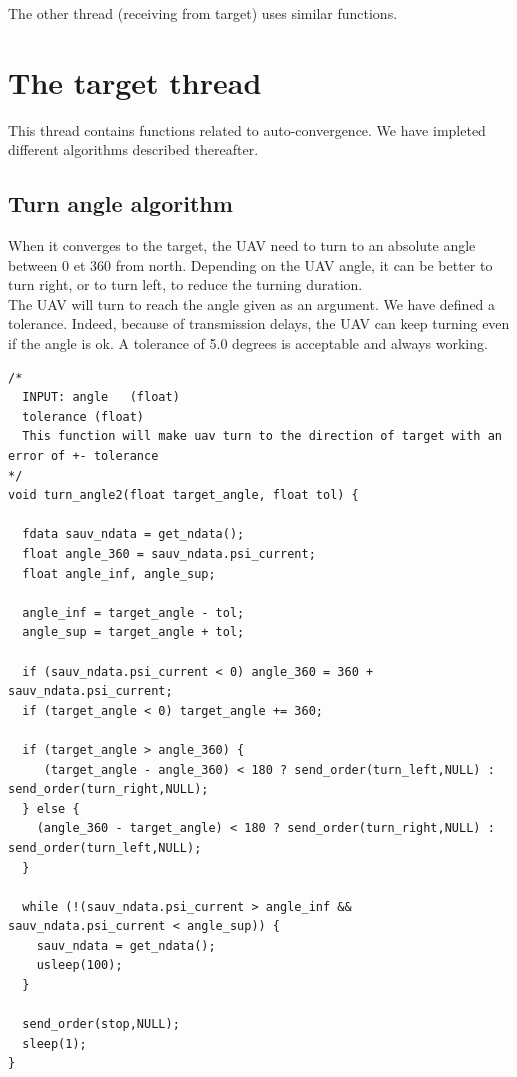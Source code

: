 The other thread (receiving from target) uses similar functions.

\section{The target thread}

This thread contains functions related to auto-convergence. We have impleted different algorithms described thereafter.\\

\subsection{Turn angle algorithm}

When it converges to the target, the UAV need to turn to an absolute angle between 0 et 360 from north. Depending on the UAV angle, it can be better to turn right, or to turn left, to reduce the turning duration.\\

The UAV will turn to reach the angle given as an argument. We have defined a tolerance. Indeed, because of transmission delays, the UAV can keep turning even if the angle is ok. A tolerance of 5.0 degrees is acceptable and always working.\\

\begin{lstlisting}
/*
  INPUT: angle   (float)
  tolerance (float)
  This function will make uav turn to the direction of target with an error of +- tolerance     
*/
void turn_angle2(float target_angle, float tol) {

  fdata sauv_ndata = get_ndata();
  float angle_360 = sauv_ndata.psi_current;
  float angle_inf, angle_sup;

  angle_inf = target_angle - tol;
  angle_sup = target_angle + tol;

  if (sauv_ndata.psi_current < 0) angle_360 = 360 + sauv_ndata.psi_current;
  if (target_angle < 0) target_angle += 360;

  if (target_angle > angle_360) {
     (target_angle - angle_360) < 180 ? send_order(turn_left,NULL) : send_order(turn_right,NULL);
  } else {
    (angle_360 - target_angle) < 180 ? send_order(turn_right,NULL) : send_order(turn_left,NULL);
  }

  while (!(sauv_ndata.psi_current > angle_inf && sauv_ndata.psi_current < angle_sup)) {
    sauv_ndata = get_ndata();
    usleep(100);
  }
  
  send_order(stop,NULL);
  sleep(1);
}
\end{lstlisting}


